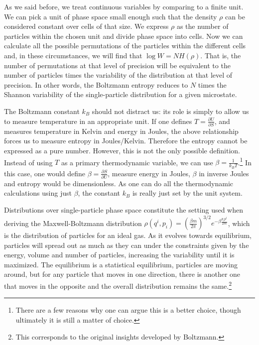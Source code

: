 \documentclass[iopart]{revtex4-1}
\begin{document}
As we said before, we treat continuous variables by comparing to a finite unit. We can pick a unit of phase space small enough such that the density $\rho$ can be considered constant over cells of that size. We express $\rho$ as the number of particles within the chosen unit and divide phase space into cells. Now we can calculate all the possible permutations of the particles within the different cells and, in these circumstances, we will find that $\log W = N H(\rho)$. That is, the number of permutations at that level of precision will be equivalent to the number of particles times the variability of the distribution at that level of precision. In other words, the Boltzmann entropy reduces to $N$ times the Shannon variability of the single-particle distribution for a given microstate.


The Boltzmann constant $k_B$ should not distract us: its role is simply to allow us to measure temperature in an appropriate unit. If one defines $T = \frac{\partial U}{\partial S}$, and measures temperature in Kelvin and energy in Joules, the above relationship forces us to measure entropy in Joules/Kelvin. Therefore the entropy cannot be expressed as a pure number. However, this is not the only possible definition. Instead of using $T$ as a primary thermodynamic variable, we can use $\beta = \frac{1}{k_B T}$.\footnote{There are a few reasons why one can argue this is a better choice, though ultimately it is still a matter of choice.} In this case, one would define $\beta = \frac{\partial S}{\partial U}$, measure energy in Joules, $\beta$ in inverse Joules and entropy would be dimensionless. As one can do all the thermodynamic calculations using just $\beta$, the constant $k_B$ is really just set by the unit system.

Distributions over single-particle phase space constitute the setting used when deriving the Maxwell-Boltzmann distribution $\rho(q^i, p_i) = \left(\frac{\beta m}{2\pi} \right)^{3/2}e^{-\beta \frac{p_ip^i}{2m}}$, which is the distribution of particles for an ideal gas. As it evolves towards equilibrium, particles will spread out as much as they can under the constraints given by the energy, volume and number of particles, increasing the variability until it is maximized. The equilibrium is a statistical equilibrium, particles are moving around, but for any particle that moves in one direction, there is another one that moves in the opposite and the overall distribution remains the same.\footnote{This corresponds to the original insights developed by Boltzmann.}
\end{document}
